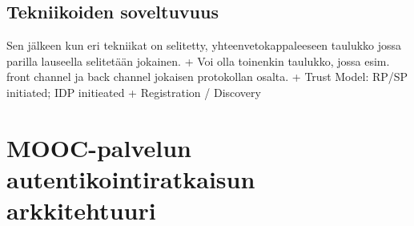 \documentclass[finnish,gradu]{tktltiki}
\begin{document}
  \subsection{Tekniikoiden soveltuvuus} %
  \label{sub:tekniikoiden_yhtäläisyydet}

  Sen jälkeen kun eri tekniikat on selitetty, yhteenvetokappaleeseen taulukko jossa parilla lauseella selitetään jokainen.
  + Voi olla toinenkin taulukko, jossa esim. front channel ja back channel jokaisen protokollan osalta.
  + Trust Model: RP/SP initiated; IDP initieated %
  + Registration / Discovery %











\section{MOOC-palvelun autentikointiratkaisun arkkitehtuuri} %
\label{sec:mooc_palvelun_autentikointiratkaisun_arkkitehtuuri}
\end{document}
